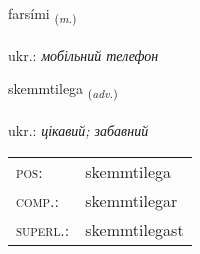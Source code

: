 \documentclass[frontgrid, backgrid]{flacards}\usepackage[]{graphicx}\usepackage[]{xcolor}
\begin{document}
\renewcommand{\flhead}{\vskip5pt \fboxsep=0pt {\small\bfseries\footnotesize Nafnorð | іменник}}
\renewcommand{\fcfoot}{\vskip5pt \fboxsep=0pt \hspace{2pt}{\small\bfseries\footnotesize 3K}}

\renewcommand{\blhead}{\vskip5pt {\small\bfseries\footnotesize Nafnorð | іменник }}
\renewcommand{\bcfoot}{\vskip5pt \hspace{2pt}{\small\bfseries\footnotesize 3K}}


{farsími \small{\textsubscript{(\textit{m.})}} \\[1ex] %
 \\
ukr.: \emph{мобільний телефон} \\  [2ex]
\renewcommand*{\arraystretch}{0.8}
}

\renewcommand{\flhead}{\vskip5pt \fboxsep=0pt {\small\bfseries\footnotesize Atviksorð | прислівник}}
\renewcommand{\fcfoot}{\vskip5pt \fboxsep=0pt \hspace{2pt}{\small\bfseries\footnotesize 3K}}

\renewcommand{\blhead}{\vskip5pt {\small\bfseries\footnotesize Atviksorð | прислівник }}
\renewcommand{\bcfoot}{\vskip5pt \hspace{2pt}{\small\bfseries\footnotesize 3K}}


{skemmtilega \small{\textsubscript{(\textit{adv.})}} \\[1ex] %
\textphonetic{[scɛmtɪlɛɣa]} \\
ukr.: \emph{цікавий; забавний} \\  [2ex]
\renewcommand*{\arraystretch}{0.8}
\begin{tabular}{ll}
\textsc{pos}: & skemmtilega \\ 
\textsc{comp.}: & skemmtilegar \\ 
\textsc{superl.}: & skemmtilegast \\
\end{tabular}
}
\end{document}
